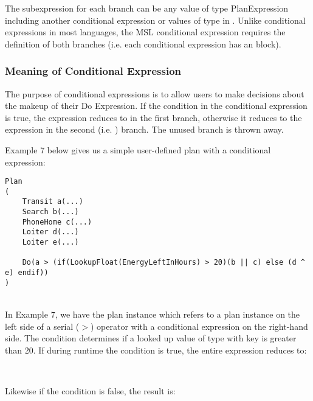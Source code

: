 The subexpression for each branch can be any value of type PlanExpression including another conditional expression or values of type  in . Unlike conditional expressions in most languages, the MSL conditional expression requires the definition of both branches (i.e. each conditional expression has an  block).

\subsubsection{Meaning of Conditional Expression}
The purpose of conditional expressions is to allow users to make decisions about the makeup of their Do Expression. If the condition in the conditional expression is true, the expression reduces to  in the first branch, otherwise it reduces to the expression in the second (i.e. ) branch. The unused branch is thrown away.

Example 7 below gives us a simple user-defined plan with a conditional expression:

\begin{verbatim}
Plan
(
    Transit a(...)
    Search b(...)
    PhoneHome c(...)
    Loiter d(...)    
    Loiter e(...)
    
    Do(a > (if(LookupFloat(EnergyLeftInHours) > 20)(b || c) else (d ^ e) endif))
)
\end{verbatim}
\\

In Example 7, we have the plan instance  which refers to a  plan instance on the left side of a serial ($>$) operator with a conditional expression on the right-hand side. The condition determines if a looked up value of type  with key  is greater than 20. If during runtime the condition is true, the entire expression reduces to:

\begin{center}
\\
\end{center}

\begin{flushleft}
Likewise if the condition is false, the result is:\\
\end{flushleft}

\begin{center}
\\
\end{center}

